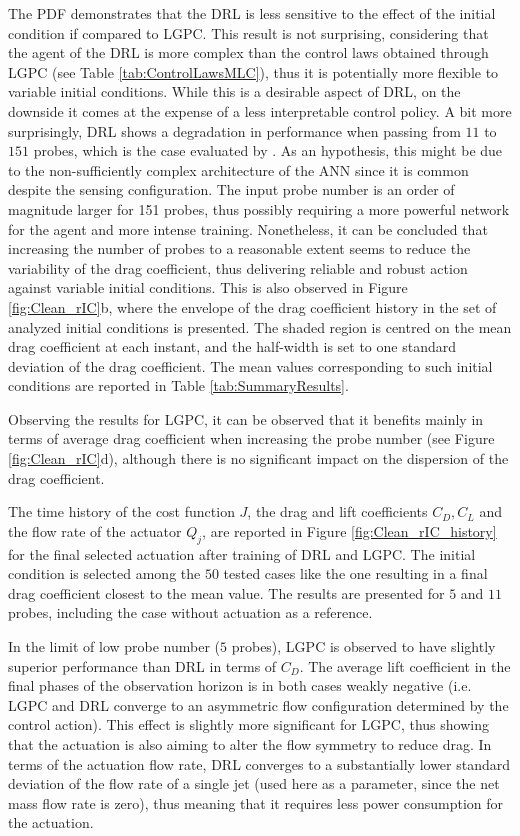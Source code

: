 The PDF demonstrates that the DRL is less sensitive to the effect of the initial condition if compared to LGPC. This result is not surprising, considering that the agent of the DRL is more complex than the control laws obtained through LGPC (see Table \ref{tab:ControlLawsMLC}), thus it is potentially more flexible to variable initial conditions. While this is a desirable aspect of DRL, on the downside it comes at the expense of a less interpretable control policy. A bit more surprisingly, DRL shows a degradation in performance when passing from $11$ to $151$ probes, which is the case evaluated by \citet{rabault2019JFM}. As an hypothesis, this might be due to the non-sufficiently complex architecture of the ANN since it is common despite the sensing configuration. The input probe number is an order of magnitude larger for 151 probes, thus possibly requiring a more powerful network for the agent and more intense training. Nonetheless, it can be concluded that increasing the number of probes to a reasonable extent seems to reduce the variability of the drag coefficient, thus delivering reliable and robust action against variable initial conditions. This is also observed in Figure \ref{fig:Clean_rIC}b, where the envelope of the drag coefficient history in the set of analyzed initial conditions is presented. The shaded region is centred on the mean drag coefficient at each instant, and the half-width is set to one standard deviation of the drag coefficient. The mean values corresponding to such initial conditions are reported in Table \ref{tab:SummaryResults}.

Observing the results for LGPC, it can be observed that it benefits mainly in terms of average drag coefficient when increasing the probe number (see Figure \ref{fig:Clean_rIC}d), although there is no significant impact on the dispersion of the drag coefficient.

The time history of the cost function $J$, the drag and lift coefficients $C_D,C_L$ and the flow rate of the actuator $Q_j$, are reported in Figure \ref{fig:Clean_rIC_history} for the final selected actuation after training of DRL and LGPC. The initial condition is selected among the $50$ tested cases like the one resulting in a final drag coefficient closest to the mean value. The results are presented for $5$ and $11$ probes, including the case without actuation as a reference. 

In the limit of low probe number ($5$ probes), LGPC is observed to have slightly superior performance than DRL in terms of $C_D$. The average lift coefficient in the final phases of the observation horizon is in both cases weakly negative (i.e. LGPC and DRL converge to an asymmetric flow configuration determined by the control action). This effect is slightly more significant for LGPC, thus showing that the actuation is also aiming to alter the flow symmetry to reduce drag. In terms of the actuation flow rate, DRL converges to a substantially lower standard deviation of the flow rate of a single jet (used here as a parameter, since the net mass flow rate is zero), thus meaning that it requires less power consumption for the actuation. 

